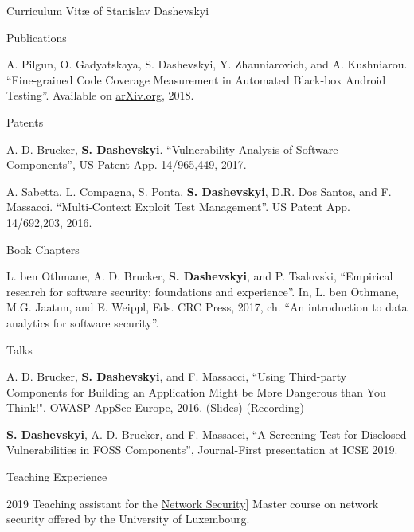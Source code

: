 \documentclass[11pt]{custom-style}
\begin{document}
\begin{cv}{Curriculum Vit\ae{} of Stanislav Dashevskyi}
\begin{cvlist}{Publications}
\begin{etaremune}
        \item A. Pilgun, O. Gadyatskaya, S. Dashevskyi, Y. Zhauniarovich, and A. Kushniarou. ``Fine-grained Code
            Coverage Measurement in Automated Black-box Android Testing''. Available on \href{https://arxiv.org/pdf/1812.10729}{arXiv.org}, 2018.
    \end{etaremune}
  \item[Patents]
    \begin{etaremune}
    \item A. D. Brucker, \textbf{S. Dashevskyi}. ``Vulnerability
      Analysis of Software Components'', US Patent App. 14/965,449,
      2017.
    \item A. Sabetta, L. Compagna, S. Ponta, \textbf{S. Dashevskyi},
      D.R. Dos Santos, and F. Massacci. ``Multi-Context Exploit Test
      Management''. US Patent App. 14/692,203, 2016.
    \end{etaremune}
  \item[Book Chapters]
    \begin{etaremune}
    \item L. ben Othmane, A. D. Brucker, \textbf{S. Dashevskyi}, and
      P. Tsalovski, ``Empirical research for software security:
      foundations and experience''. In, L. ben Othmane, M.G. Jaatun,
      and E. Weippl, Eds. CRC Press, 2017, ch. ``An introduction to
      data analytics for software security''.
    \end{etaremune}
    \item[Talks]
      \begin{etaremune}
      \item A. D. Brucker, \textbf{S. Dashevskyi}, and F. Massacci,
        ``Using Third-party Components for Building an Application
        Might be More Dangerous than You Think!". OWASP AppSec Europe,
        2016.
        \href{https://www.brucker.ch/bibliography/download/2016/talk-brucker.ea-owasp-third-party-security-2016-2x2.pdf}{(Slides)}
        \href{https://www.youtube.com/watch?v=zUDaP0m-gFU&feature=youtu.be}{(Recording)}
    \item \textbf{S. Dashevskyi}, A. D. Brucker, and F. Massacci,
        ``A Screening Test for Disclosed Vulnerabilities in FOSS Components'', Journal-First presentation at ICSE 2019.
      \end{etaremune}
  \end{cvlist}

  \begin{cvlist}{Teaching Experience}
      \item[2019] Teaching assistant for the \href{http://satoss.uni.lu/courses/networksecurity/}{Network Security}] 
                Master course on network security offered by the University of Luxembourg.


\end{cvlist}
\end{cv}
\end{document}
